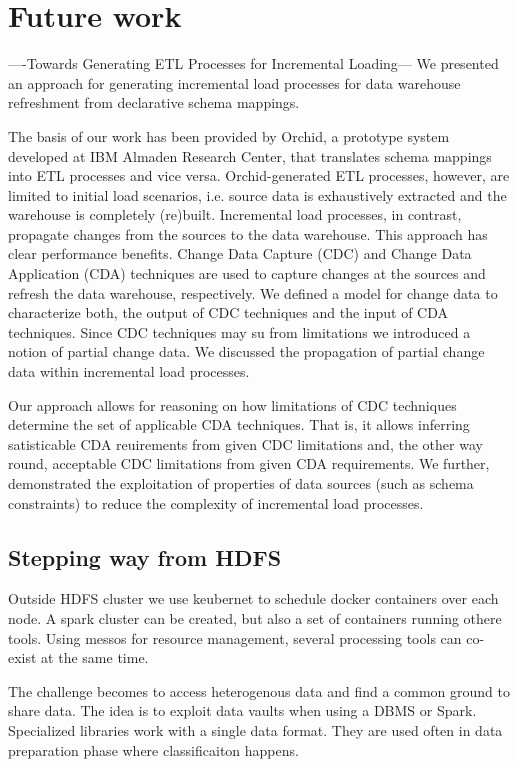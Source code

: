 \section{Future work}
\label{future_work}

----Towards Generating ETL Processes for Incremental Loading---
We presented an approach for generating incremental load processes for data  warehouse  refreshment  from
declarative schema mappings.  

The basis of our work has been provided by Orchid, a prototype system developed at IBM Almaden Research
Center, that translates schema mappings into ETL processes and vice versa.  Orchid-generated ETL processes,
however, are limited to initial load scenarios, i.e. source data is exhaustively extracted and the warehouse
is completely (re)built. Incremental load processes, in contrast, propagate changes from the sources to the
data warehouse. This approach has clear performance benefits. Change Data Capture (CDC) and Change Data
Application (CDA) techniques are used to capture changes at the sources and refresh the data warehouse,
respectively.  We defined a model for change data to  characterize  both,  the  output  of  CDC techniques 
and  the  input  of  CDA  techniques.   Since  CDC techniques may su from limitations we introduced a notion
of partial  change  data.  We discussed the propagation of  partial  change  data  within  incremental  load
processes.

Our  approach  allows  for  reasoning  on  how  limitations  of CDC techniques determine the set of applicable
CDA techniques.  That is, it allows inferring satisticable CDA reuirements from given CDC limitations and, the
other way round, acceptable CDC limitations from given CDA requirements. We further, demonstrated the exploitation
of properties of data sources (such as schema constraints) to reduce the complexity  of  incremental  load
processes.

\subsection{Stepping way from HDFS}
Outside HDFS cluster we use keubernet to schedule docker containers over each node. A spark cluster can be
created, but also a set of containers running othere tools. Using messos for resource management, several
processing tools can co-exist at the same time.

The challenge becomes to access heterogenous data and find a common ground to share data. The idea is to
exploit data vaults when using a DBMS or Spark. Specialized libraries work with a single data format. They
are used often in data preparation phase where classificaiton happens. 


